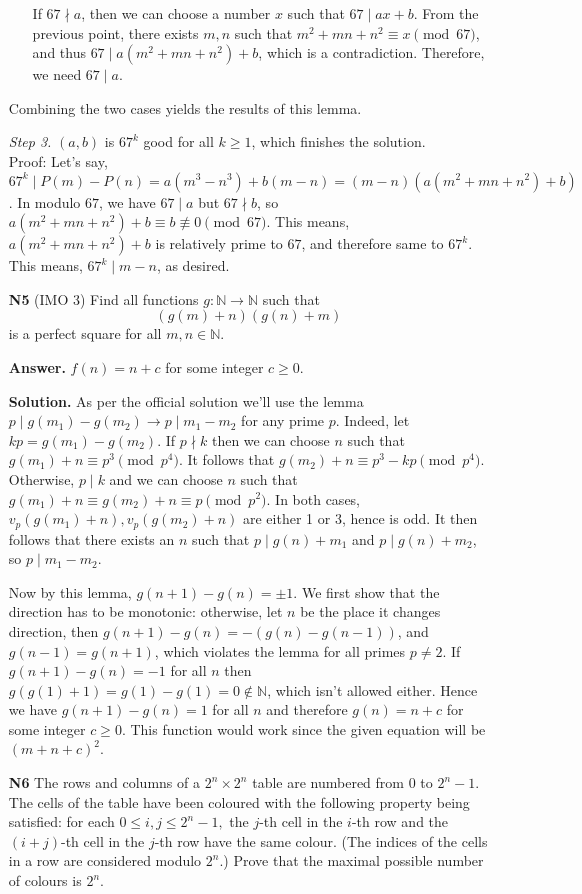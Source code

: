 \documentclass[11pt]{article}
\newcommand{\bbN}{\mathbb N}
\newcommand{\<}{\langle}
\renewcommand{\>}{\rangle}
\begin{document}
\begin{enumerate}
\begin{itemize}
		If $67\nmid a$, then we can choose a number $x$ such that $67\mid ax+b$. From the previous point, there exists $m, n$ such that $m^2+mn+n^2\equiv x\pmod{67}$, and thus $67\mid a(m^2+mn+n^2)+b$, which is a contradiction. 
		Therefore, we need $67\mid a$. 
	\end{itemize}
	
	Combining the two cases yields the results of this lemma. 
	
	\emph{Step 3.} $(a, b)$ is $67^k$ good for all $k\ge 1$, which finishes the solution. \\
	Proof: Let's say, $67^k\mid P(m)-P(n)=a(m^3-n^3)+b(m-n)=(m-n)(a(m^2+mn+n^2)+b)$. 
	In modulo $67$, we have $67\mid a$ but $67\nmid b$, so $a(m^2+mn+n^2)+b\equiv b\not\equiv 0\pmod{67}$. This means, $a(m^2+mn+n^2)+b$ is relatively prime to $67$, and therefore same to $67^k$. This means, $67^k\mid m-n$, as desired. 
	
	\item [\textbf{N5}] (IMO 3) Find all functions $g:\mathbb{N}\rightarrow\mathbb{N}$ such that\[\left(g(m)+n\right)\left(g(n)+m\right)\]is a perfect square for all $m,n\in\mathbb{N}.$
	
	\textbf{Answer.} $f(n)=n+c$ for some integer $c\ge 0$. 
	
	\textbf{Solution.} 
	As per the official solution we'll use the lemma 
	$p\mid g(m_1)-g(m_2)\to p\mid m_1-m_2$ for any prime $p$. 
	Indeed, let $kp=g(m_1)-g(m_2)$. 
	If $p\nmid k$ then we can choose $n$ such that $g(m_1)+n\equiv p^3\pmod{p^4}$. 
	It follows that $g(m_2)+n\equiv p^3-kp\pmod{p^4}$. 
	Otherwise, $p\mid k$ and we can choose $n$ such that $g(m_1)+n\equiv g(m_2)+n\equiv p\pmod{p^2}$. 
	In both cases, $v_p(g(m_1)+n), v_p(g(m_2)+n)$ are either 1 or 3, hence is odd. 
	It then follows that there exists an $n$ such that $p\mid g(n)+m_1$ and $p\mid g(n)+m_2$, so $p\mid m_1-m_2$. 
	
	Now by this lemma, $g(n+1)-g(n)=\pm 1$. We first show that the direction has to be monotonic: 
	otherwise, let $n$ be the place it changes direction, then 
	$g(n+1)-g(n)=-(g(n)-g(n-1))$, and $g(n-1)=g(n+1)$, which violates the lemma for all primes $p\neq 2$. 
	If $g(n+1)-g(n)=-1$ for all $n$ then $g(g(1)+1)=g(1)-g(1)=0\not\in \bbN$, which isn't allowed either. 
	Hence we have $g(n+1)-g(n)=1$ for all $n$ and therefore 
	$g(n)=n+c$ for some integer $c\ge 0$. 
	This function would work since the given equation will be $(m+n+c)^2$. 
	
	\item[\textbf{N6}] The rows and columns of a $2^n \times 2^n$ table are numbered from $0$ to $2^{n}-1.$ The cells of the table have been coloured with the following property being satisfied: for each $0 \leq i,j \leq 2^n - 1,$ the $j$-th cell in the $i$-th row and the $(i+j)$-th cell in the $j$-th row have the same colour. (The indices of the cells in a row are considered modulo $2^n$.) Prove that the maximal possible number of colours is $2^n$.
	

\end{enumerate}
\end{document}
